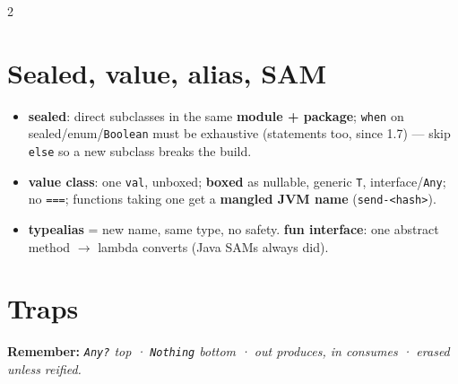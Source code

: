 \documentclass[8pt]{extarticle}
\newcommand\eqeqeq{\texttt{\hbox{=}\hbox{=}\hbox{=}}}
\begin{document}
\begin{multicols}{2}
\section{Sealed, value, alias, SAM}
\begin{itemize}\raggedright
  \item \textbf{sealed}: direct subclasses in the same \textbf{module + package}; \texttt{when}
        on sealed/enum/\texttt{Boolean} must be exhaustive (statements too, since 1.7) — skip
        \texttt{else} so a new subclass breaks the build.
  \item \textbf{value class}: one \texttt{val}, unboxed; \textbf{boxed} as nullable, generic
        \texttt{T}, interface/\texttt{Any}; no \eqeqeq; functions taking one get a
        \textbf{mangled JVM name} (\texttt{send-<hash>}).
  \item \textbf{typealias} = new name, same type, no safety. \textbf{fun interface}: one
        abstract method $\to$ lambda converts (Java SAMs always did).
\end{itemize}

\section{Traps}
\begin{itemize}\raggedright
\end{itemize}

\textbf{Remember:} \emph{\texttt{Any?} top · \texttt{Nothing} bottom · out produces, in
consumes · erased unless reified.}


\end{multicols}

\end{document}
